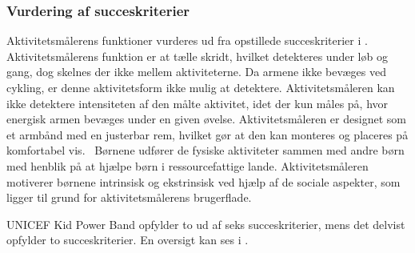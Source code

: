\subsubsection{Vurdering af succeskriterier}
Aktivitetsmålerens funktioner vurderes ud fra opstillede succeskriterier i . \\
Aktivitetsmålerens funktion er at tælle skridt, hvilket detekteres under løb og gang, dog skelnes der ikke mellem aktiviteterne. Da armene ikke bevæges ved cykling, er denne aktivitetsform ikke mulig at detektere. Aktivitetsmåleren kan ikke detektere intensiteten af den målte aktivitet, idet der kun måles på, hvor energisk armen bevæges under en given øvelse. Aktivitetsmåleren er designet som et armbånd med en justerbar rem, hvilket gør at den kan monteres og placeres på komfortabel vis.~\citep{PowerManual2015} \newline
Børnene udfører de fysiske aktiviteter sammen med andre børn med henblik på at hjælpe børn i ressourcefattige lande. Aktivitetsmåleren motiverer børnene intrinsisk og ekstrinsisk ved hjælp af de sociale aspekter, som ligger til grund for aktivitetsmålerens brugerflade.~\citep{PowerAbout2015} 

UNICEF Kid Power Band opfylder to ud af seks succeskriterier, mens det delvist opfylder to succeskriterier. En oversigt kan ses i .

